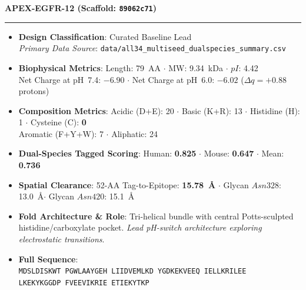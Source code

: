 \documentclass[11pt]{article}
\begin{document}
\noindent\textbf{\color{navyblue}\large APEX-EGFR-12  \quad (Scaffold: \texttt{89062c71})} \\
\vspace{-0.4em}
\rule{\textwidth}{0.6pt}
\vspace{-0.2em}
\begin{itemize}
  \setlength{\itemsep}{2pt}
  \setlength{\parskip}{0pt}
  \item \textbf{Design Classification}: Curated Baseline Lead \\
    \textit{Primary Data Source}: \texttt{\small data/all34\_multiseed\_dualspecies\_summary.csv}
  \item \textbf{Biophysical Metrics}: Length: 79~AA $\cdot$ MW: 9.34~kDa $\cdot$ $pI$: 4.42 \\
    Net Charge at pH~7.4: $-6.90$ $\cdot$ Net Charge at pH~6.0: $-6.02$ ($\Delta q = +0.88$ protons)
  \item \textbf{Composition Metrics}: Acidic (D+E): 20 $\cdot$ Basic (K+R): 13 $\cdot$ Histidine (H): 1 $\cdot$ Cysteine (C): \textbf{0} \\
    Aromatic (F+Y+W): 7 $\cdot$ Aliphatic: 24
  \item \textbf{Dual-Species Tagged Scoring}: Human: \textbf{0.825} $\cdot$ Mouse: \textbf{0.647} $\cdot$ Mean: \textbf{0.736}
  \item \textbf{Spatial Clearance}: 52-AA Tag-to-Epitope: \textbf{15.78~\AA} $\cdot$ Glycan $Asn328$: 13.0~\AA $\cdot$ Glycan $Asn420$: 15.1~\AA
  \item \textbf{Fold Architecture \& Role}: Tri-helical bundle with central Potts-sculpted histidine/carboxylate pocket. \textit{Lead pH-switch architecture exploring electrostatic transitions}.
  \item \textbf{Full Sequence}: \\
    \texttt{\small MDSLDISKWT PGWLAAYGEH LIIDVEMLKD YGDKEKVEEQ IELLKRILEE \\
    LKEKYKGGDP FVEEVIKRIE ETIEKYTKP}
\end{itemize}
\vspace{0.8em}
\end{document}
